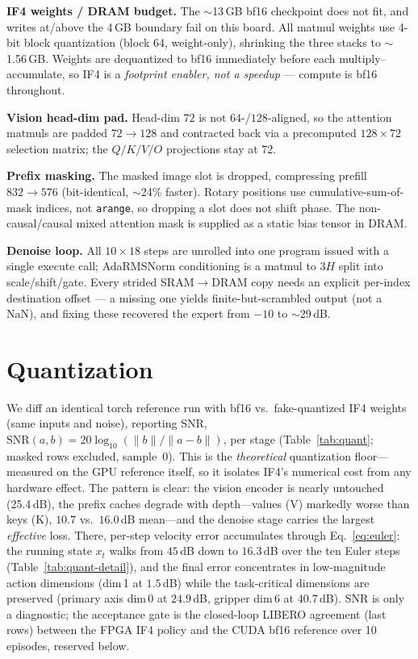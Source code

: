 \documentclass[11pt]{article}
\newcommand{\iffour}{IF4}
\newcommand{\bfteen}{bf16}
\begin{document}
\textbf{\iffour{} weights / DRAM budget.} The $\sim$13\,GB \bfteen{} checkpoint
does not fit, and writes at/above the 4\,GB boundary fail on this board. All
matmul weights use 4-bit block quantization (block 64, weight-only),
shrinking the three stacks to $\sim$1.56\,GB. Weights are dequantized to
\bfteen{} immediately before each multiply--accumulate, so \iffour{} is a
\emph{footprint enabler, not a speedup} --- compute is \bfteen{} throughout.

\textbf{Vision head-dim pad.} Head-dim $72$ is not $64$-/$128$-aligned, so the
attention matmuls are padded $72{\to}128$ and contracted back via a precomputed
$128{\times}72$ selection matrix; the $Q/K/V/O$ projections stay at $72$.

\textbf{Prefix masking.} The masked image slot is dropped, compressing prefill
$832{\to}576$ (bit-identical, $\sim$24\% faster). Rotary positions use
cumulative-sum-of-mask indices, not \texttt{arange}, so dropping a slot does
not shift phase. The non-causal/causal mixed attention mask is supplied as a
static bias tensor in DRAM.

\textbf{Denoise loop.} All $10{\times}18$ steps are unrolled into one program
issued with a single execute call; AdaRMSNorm conditioning is a matmul to $3H$
split into scale/shift/gate. Every strided SRAM$\to$DRAM copy needs an explicit
per-index destination offset --- a missing one yields finite-but-scrambled
output (not a NaN), and fixing these recovered the expert from $-10$ to
$\sim$29\,dB.

\section{Quantization}
\label{sec:quant}
We diff an identical torch reference run with \bfteen{} vs.\ fake-quantized
\iffour{} weights (same inputs and noise), reporting SNR,
$\mathrm{SNR}(a,b){=}20\log_{10}(\lVert b\rVert/\lVert a{-}b\rVert)$, per stage
(Table~\ref{tab:quant}; masked rows excluded, sample~0). This is the
\emph{theoretical} quantization floor---measured on the GPU reference itself, so
it isolates \iffour{}'s numerical cost from any hardware effect. The pattern is
clear: the vision encoder is nearly untouched (25.4\,dB), the prefix caches
degrade with depth---values (V) markedly worse than keys (K), $10.7$ vs.\
$16.0$\,dB mean---and the denoise stage carries the largest \emph{effective}
loss. There, per-step velocity error accumulates through Eq.~\eqref{eq:euler}:
the running state $x_t$ walks from $45$\,dB down to $16.3$\,dB over the ten Euler
steps (Table~\ref{tab:quant-detail}), and the final error concentrates in
low-magnitude action dimensions (dim\,1 at $1.5$\,dB) while the task-critical
dimensions are preserved (primary axis dim\,0 at $24.9$\,dB, gripper dim\,6 at
$40.7$\,dB). SNR is only a diagnostic; the acceptance gate is the closed-loop
LIBERO agreement (last rows) between the FPGA \iffour{} policy and the CUDA
\bfteen{} reference over 10 episodes, reserved below.
\end{document}
